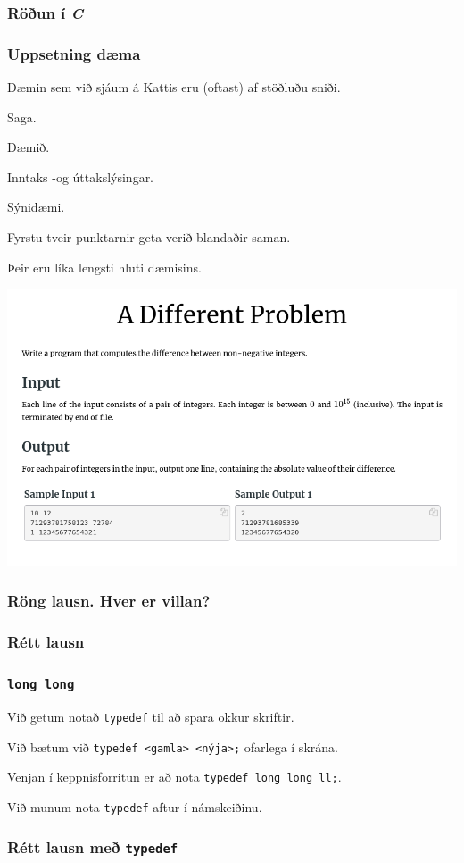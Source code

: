 {
	\frametitle{Röðun í \emph{C}}
}

{
	\frametitle{Uppsetning dæma}
	{
		\item<1-> Dæmin sem við sjáum á Kattis eru (oftast) af stöðluðu sniði.
		{
			\item<2-> Saga.
			\item<3-> Dæmið.
			\item<4-> Inntaks -og úttakslýsingar.
			\item<5-> Sýnidæmi.
		}
		\item<6-> Fyrstu tveir punktarnir geta verið blandaðir saman.
		\item<7-> Þeir eru líka lengsti hluti dæmisins.
	}
}
{
	\includegraphics[scale = 0.38]{fig/daemi}
}

{
	\frametitle{Röng lausn. Hver er villan?}
}

{
	\frametitle{Rétt lausn}
}

{
	\frametitle{\texttt{long long}}
	{
		\item<1-> Við getum notað \texttt{typedef} til að spara okkur skriftir.
		\item<2-> Við bætum við \texttt{typedef <gamla> <nýja>;} ofarlega í skrána.
		\item<3-> Venjan í keppnisforritun er að nota \texttt{typedef long long ll;}.
		\item<4-> Við munum nota \texttt{typedef} aftur í námskeiðinu.
	}
}

{
	\frametitle{Rétt lausn með \texttt{typedef}}
}

